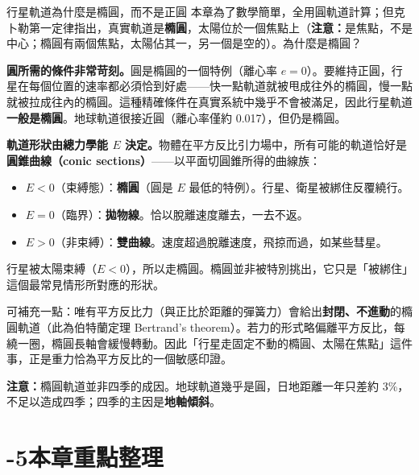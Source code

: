 \documentclass[11pt]{article}
\begin{document}
\begin{延伸框}{行星軌道為什麼是橢圓，而不是正圓}
本章為了數學簡單，全用圓軌道計算；但克卜勒第一定律指出，真實軌道是\textbf{橢圓}，太陽位於一個焦點上（\textbf{注意：}是焦點，不是中心；橢圓有兩個焦點，太陽佔其一，另一個是空的）。為什麼是橢圓？

\textbf{圓所需的條件非常苛刻。}圓是橢圓的一個特例（離心率 $e=0$）。要維持正圓，行星在每個位置的速率都必須恰到好處——快一點軌道就被甩成往外的橢圓，慢一點就被拉成往內的橢圓。這種精確條件在真實系統中幾乎不會被滿足，因此行星軌道\textbf{一般是橢圓}。地球軌道很接近圓（離心率僅約 0.017），但仍是橢圓。

\textbf{軌道形狀由總力學能 $E$ 決定。}物體在平方反比引力場中，所有可能的軌道恰好是\textbf{圓錐曲線（conic sections）}——以平面切圓錐所得的曲線族：
\begin{itemize}\setlength{\itemsep}{1pt}
\item $E<0$（束縛態）：\textbf{橢圓}（圓是 $E$ 最低的特例）。行星、衛星被綁住反覆繞行。
\item $E=0$（臨界）：\textbf{拋物線}。恰以脫離速度離去，一去不返。
\item $E>0$（非束縛）：\textbf{雙曲線}。速度超過脫離速度，飛掠而過，如某些彗星。
\end{itemize}
行星被太陽束縛（$E<0$），所以走橢圓。橢圓並非被特別挑出，它只是「被綁住」這個最常見情形所對應的形狀。

可補充一點：唯有平方反比力（與正比於距離的彈簧力）會給出\textbf{封閉、不進動}的橢圓軌道（此為伯特蘭定理 Bertrand's theorem）。若力的形式略偏離平方反比，每繞一圈，橢圓長軸會緩慢轉動。因此「行星走固定不動的橢圓、太陽在焦點」這件事，正是重力恰為平方反比的一個敏感印證。

\textbf{注意：}橢圓軌道並非四季的成因。地球軌道幾乎是圓，日地距離一年只差約 3\%，不足以造成四季；四季的主因是\textbf{地軸傾斜}。
\end{延伸框}

\section*{-5\quad 本章重點整理}
\end{document}
